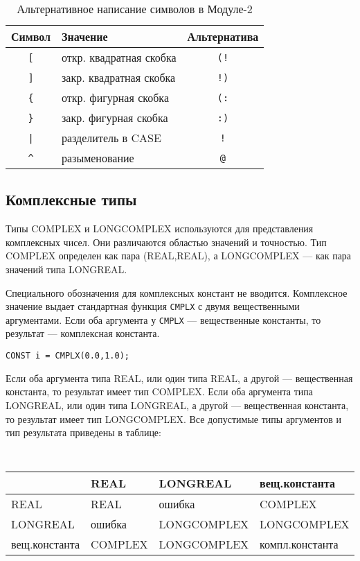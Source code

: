 \begin{table}[htbp]
\begin{center}
\begin{tabular}{|c|l|c|}
\hline
\bf Символ  & \bf Значение   & \bf Альтернатива  \\ \hline
  \verb+[+  & откр. квадратная скобка  & \verb+(!+        \\
  \verb+]+  & закр. квадратная скобка  & \verb+!)+        \\
  \verb+{+  & откр. фигурная скобка    & \verb+(:+        \\
  \verb+}+  & закр. фигурная скобка    & \verb+:)+        \\
  \verb+|+  & разделитель в CASE       & \verb+!+         \\
  \verb+^+  & разыменование            & \verb+@+         \\
\hline
\end{tabular}
\end{center}
\caption{Альтернативное написание символов в Модуле-2}\label{table:m2:ISO:alt}
\end{table}

\subsection{Комплексные типы}\label{m2:ISO:complex}

Типы COMPLEX и LONGCOMPLEX используются для представления комплексных чисел.
Они различаются областью значений и точностью.
Тип COMPLEX определен как пара (REAL,REAL), а LONGCOMPLEX ---
как пара значений типа LONGREAL.

Специального обозначения для комплексных констант не вводится.
Комплексное значение выдает стандартная функция
{\tt CMPLX} с двумя вещественными аргументами.
Если оба аргумента у {\tt CMPLX} --- вещественные константы, то
результат --- комплексная константа.
\begin{verbatim}
CONST i = CMPLX(0.0,1.0);
\end{verbatim}

Если оба аргумента типа REAL, или один типа
REAL, а другой --- вещественная константа, то результат
имеет тип COMPLEX. 
Если оба аргумента типа LONGREAL, или один типа
LONGREAL, а другой --- вещественная константа, то результат имеет тип
LONGCOMPLEX.
Все допустимые типы аргументов и тип результата приведены в таблице:
\begin{center}
\small \tt
\begin{tabular}{|l|lll|}\hline
              & REAL     & LONGREAL    & вещ.константа    \\ \hline
REAL          & REAL     & ошибка      & COMPLEX          \\
LONGREAL      & ошибка   & LONGCOMPLEX & LONGCOMPLEX      \\
вещ.константа & COMPLEX  & LONGCOMPLEX & компл.константа \\ \hline
\end{tabular}
\end{center}

